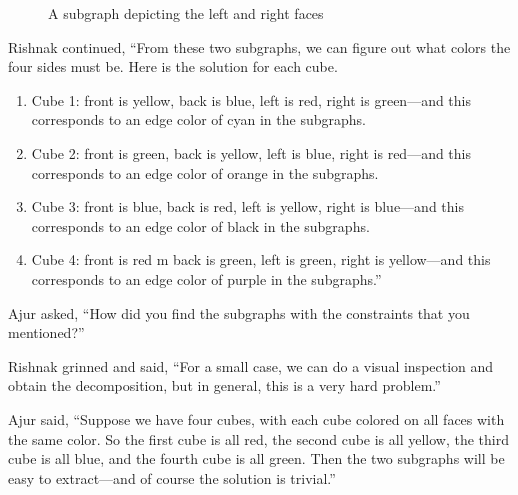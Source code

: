 \begin{figure}[h]
\begin{center}
\caption{A subgraph depicting the left and right faces}\label{22g7}
\end{center}
\end{figure}

Rishnak continued, ``From these two subgraphs, we can figure out what colors the four sides must be. Here is the solution for each cube.
\begin{enumerate}
    \item Cube 1: front is yellow, back is blue, left is red, right is green---and this corresponds to an edge color of cyan in the subgraphs.
    \item Cube 2: front is green, back is yellow, left is blue, right is red---and this corresponds to an edge color of orange in the subgraphs.
    \item Cube 3: front is blue, back is red, left is yellow, right is blue---and this corresponds to an edge color of black in the subgraphs.
    \item Cube 4: front is red m back is green, left is green, right is yellow---and this corresponds to an edge color of purple in the subgraphs.''
\end{enumerate}

Ajur asked, ``How did you find the subgraphs with the constraints that you mentioned?''

Rishnak grinned and said, ``For a small case, we can do a visual inspection and obtain the decomposition, but in general, this is a very hard problem.''

Ajur said, ``Suppose we have four cubes, with each cube colored on all faces with the same color. So the first cube is all red, the second cube is all yellow, the third cube is all blue, and the fourth cube is all green. Then the two subgraphs will be easy to extract---and of course the solution is trivial.''

